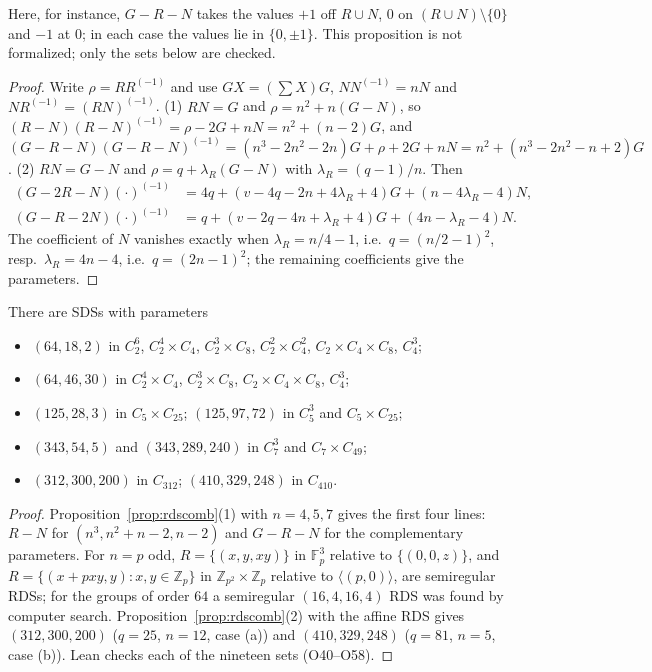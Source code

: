 \noindent Here, for instance, $G - R - N$ takes the values $+1$ off $R \cup N$, $0$ on
$(R \cup N) \setminus \{0\}$ and $-1$ at $0$; in each case the values lie in $\{0, \pm1\}$.
This proposition is not formalized; only the sets below are checked.

\begin{proof}
Write $\rho = RR^{(-1)}$ and use $GX = (\sum X)G$, $NN^{(-1)} = nN$ and
$NR^{(-1)} = (RN)^{(-1)}$.
(1) $RN = G$ and $\rho = n^2 + n(G - N)$, so
$(R - N)(R - N)^{(-1)} = \rho - 2G + nN = n^2 + (n - 2)G$, and
$(G - R - N)(G - R - N)^{(-1)} = (n^3 - 2n^2 - 2n)G + \rho + 2G + nN
= n^2 + (n^3 - 2n^2 - n + 2)G$.
(2) $RN = G - N$ and $\rho = q + \lambda_R(G - N)$ with $\lambda_R = (q-1)/n$. Then
\begin{align*}
(G - 2R - N)(\cdot)^{(-1)} &= 4q + (v - 4q - 2n + 4\lambda_R + 4)G + (n - 4\lambda_R - 4)N,\\
(G - R - 2N)(\cdot)^{(-1)} &= q + (v - 2q - 4n + \lambda_R + 4)G + (4n - \lambda_R - 4)N .
\end{align*}
The coefficient of $N$ vanishes exactly when $\lambda_R = n/4 - 1$, i.e.\ $q = (n/2 - 1)^2$, resp.\
$\lambda_R = 4n - 4$, i.e.\ $q = (2n-1)^2$; the remaining coefficients give the parameters.
\end{proof}

\begin{theorem}\label{thm:z23}
There are SDSs with parameters
\begin{itemize}
\item $(64, 18, 2)$ in $C_2^6$, $C_2^4 \times C_4$, $C_2^3 \times C_8$, $C_2^2 \times C_4^2$,
  $C_2 \times C_4 \times C_8$, $C_4^3$;
\item $(64, 46, 30)$ in $C_2^4 \times C_4$, $C_2^3 \times C_8$, $C_2 \times C_4 \times C_8$,
  $C_4^3$;
\item $(125, 28, 3)$ in $C_5 \times C_{25}$; $(125, 97, 72)$ in $C_5^3$ and
  $C_5 \times C_{25}$;
\item $(343, 54, 5)$ and $(343, 289, 240)$ in $C_7^3$ and $C_7 \times C_{49}$;
\item $(312, 300, 200)$ in $C_{312}$; $(410, 329, 248)$ in $C_{410}$.
\end{itemize}
\end{theorem}

\begin{proof}
Proposition~\ref{prop:rdscomb}(1) with $n = 4, 5, 7$ gives the first four lines: $R - N$ for
$(n^3, n^2 + n - 2, n - 2)$ and $G - R - N$ for the complementary parameters. For $n = p$ odd,
$R = \{(x, y, xy)\}$ in $\mathbb{F}_p^3$ relative to $\{(0, 0, z)\}$, and
$R = \{(x + pxy, y) : x, y \in \mathbb{Z}_p\}$ in $\mathbb{Z}_{p^2} \times \mathbb{Z}_p$ relative
to $\langle (p, 0)\rangle$, are semiregular RDSs; for the groups of order $64$ a semiregular
$(16, 4, 16, 4)$ RDS was found by computer search. Proposition~\ref{prop:rdscomb}(2) with the
affine RDS gives $(312, 300, 200)$ ($q = 25$, $n = 12$, case (a)) and $(410, 329, 248)$
($q = 81$, $n = 5$, case (b)). Lean checks each of the nineteen sets (O40--O58).
\end{proof}

